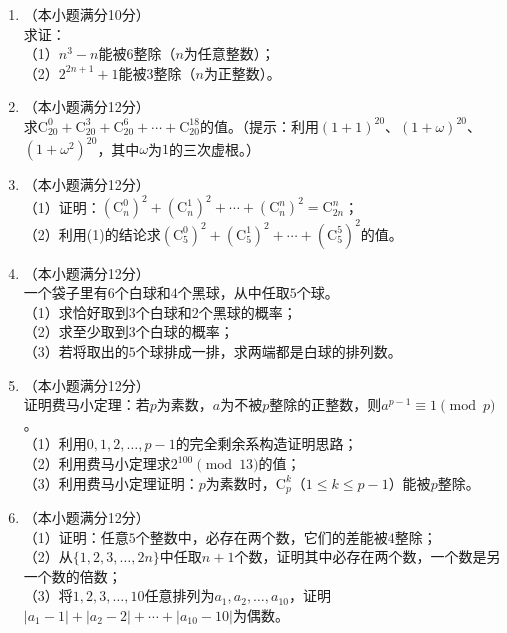 \documentclass[12pt, a4paper]{ctexart}
\begin{document}
\begin{enumerate}[label=\arabic*.]

\item （本小题满分10分）\\
求证：\\
（1）$n^3-n$能被$6$整除（$n$为任意整数）；\\
（2）$2^{2n+1}+1$能被$3$整除（$n$为正整数）。
\vspace{6cm}

\item （本小题满分12分）\\
求$\mathrm{C}_{20}^0+\mathrm{C}_{20}^3+\mathrm{C}_{20}^6+\cdots+\mathrm{C}_{20}^{18}$的值。（提示：利用$(1+1)^{20}$、$(1+\omega)^{20}$、$(1+\omega^2)^{20}$，其中$\omega$为$1$的三次虚根。）
\vspace{6cm}

\item （本小题满分12分）\\
（1）证明：$(\mathrm{C}_n^0)^2+(\mathrm{C}_n^1)^2+\cdots+(\mathrm{C}_n^n)^2=\mathrm{C}_{2n}^n$；\\
（2）利用(1)的结论求$(\mathrm{C}_5^0)^2+(\mathrm{C}_5^1)^2+\cdots+(\mathrm{C}_5^5)^2$的值。
\vspace{6cm}

\item （本小题满分12分）\\
一个袋子里有$6$个白球和$4$个黑球，从中任取$5$个球。\\
（1）求恰好取到$3$个白球和$2$个黑球的概率；\\
（2）求至少取到$3$个白球的概率；\\
（3）若将取出的$5$个球排成一排，求两端都是白球的排列数。
\vspace{6cm}

\item （本小题满分12分）\\
证明费马小定理：若$p$为素数，$a$为不被$p$整除的正整数，则$a^{p-1}\equiv 1\pmod{p}$。\\
（1）利用$0,1,2,\ldots,p-1$的完全剩余系构造证明思路；\\
（2）利用费马小定理求$2^{100}\pmod{13}$的值；\\
（3）利用费马小定理证明：$p$为素数时，$\mathrm{C}_p^k$（$1\leq k\leq p-1$）能被$p$整除。
\vspace{6cm}

\item （本小题满分12分）\\
（1）证明：任意$5$个整数中，必存在两个数，它们的差能被$4$整除；\\
（2）从$\{1,2,3,\ldots,2n\}$中任取$n+1$个数，证明其中必存在两个数，一个数是另一个数的倍数；\\
（3）将$1,2,3,\ldots,10$任意排列为$a_1,a_2,\ldots,a_{10}$，证明$|a_1-1|+|a_2-2|+\cdots+|a_{10}-10|$为偶数。
\vspace{6cm}

\end{enumerate}
\end{document}
